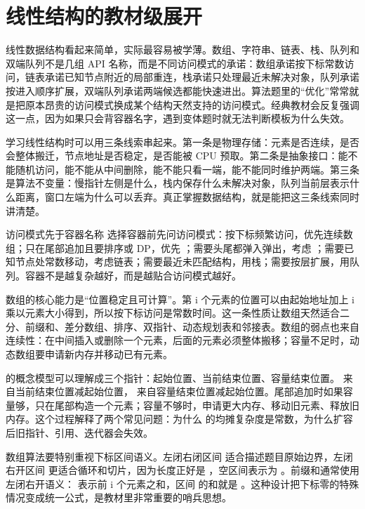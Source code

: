 \section{线性结构的教材级展开}

线性数据结构看起来简单，实际最容易被学薄。数组、字符串、链表、栈、队列和双端队列不是几组 API 名称，而是不同访问模式的承诺：数组承诺按下标常数访问，链表承诺已知节点附近的局部重连，栈承诺只处理最近未解决对象，队列承诺按进入顺序扩展，双端队列承诺两端候选都能快速进出。算法题里的“优化”常常就是把原本昂贵的访问模式换成某个结构天然支持的访问模式。经典教材会反复强调这一点，因为如果只会背容器名字，遇到变体题时就无法判断模板为什么失效。

学习线性结构时可以用三条线索串起来。第一条是物理存储：元素是否连续，是否会整体搬迁，节点地址是否稳定，是否能被 CPU 预取。第二条是抽象接口：能不能随机访问，能不能从中间删除，能不能只看一端，能不能同时维护两端。第三条是算法不变量：慢指针左侧是什么，栈内保存什么未解决对象，队列当前层表示什么距离，窗口左端为什么可以丢弃。真正掌握数据结构，就是能把这三条线索同时讲清楚。

\begin{principlebox}{访问模式先于容器名称}
选择容器前先问访问模式：按下标频繁访问，优先连续数组；只在尾部追加且要排序或 DP，优先 ；需要头尾都弹入弹出，考虑 ；需要已知节点处常数移动，考虑链表；需要最近未匹配结构，用栈；需要按层扩展，用队列。容器不是越复杂越好，而是越贴合访问模式越好。
\end{principlebox}


数组的核心能力是“位置稳定且可计算”。第 i 个元素的位置可以由起始地址加上 i 乘以元素大小得到，所以按下标访问是常数时间。这一条性质让数组天然适合二分、前缀和、差分数组、排序、双指针、动态规划表和邻接表。数组的弱点也来自连续性：在中间插入或删除一个元素，后面的元素必须整体搬移；容量不足时，动态数组要申请新内存并移动已有元素。

 的概念模型可以理解成三个指针：起始位置、当前结束位置、容量结束位置。 来自当前结束位置减起始位置， 来自容量结束位置减起始位置。尾部追加时如果容量够，只在尾部构造一个元素；容量不够时，申请更大内存、移动旧元素、释放旧内存。这个过程解释了两个常见问题：为什么  的均摊复杂度是常数，为什么扩容后旧指针、引用、迭代器会失效。

数组算法要特别重视下标区间语义。左闭右闭区间  适合描述题目原始边界，左闭右开区间 \code{[left, right)} 更适合循环和切片，因为长度正好是 ，空区间表示为 。前缀和通常使用左闭右开语义： 表示前 i 个元素之和，区间 \code{[left, right)} 的和就是 。这种设计把下标零的特殊情况变成统一公式，是教材里非常重要的哨兵思想。

